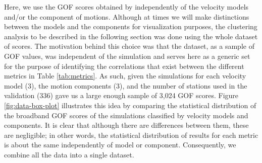Here, we use the GOF scores obtained by \citet{Taborda_2014_BSSA} independently of the velocity models and/or the component of motions. Although at times we will make distinctions between the models and the components for visualization purposes, the clustering analysis to be described in the following section was done using the whole dataset of scores. The motivation behind this choice was that the dataset, as a sample of GOF values, was independent of the simulation and serves here as a generic set for the purpose of identifying the correlations that exist between the different metrics in Table \ref{tab:metrics}. As such, given the simulations for each velocity model (3), the motion components (3), and the number of stations used in the validation (336) gave us a large enough sample of 3,024 GOF scores. Figure \ref{fig:data-box-plot} illustrates this idea by comparing the statistical distribution of the broadband GOF scores of the simulations classified by velocity models and components. It is clear that although there are differences between them, these are negligible; in other words, the statistical distribution of results for each metric is about the same independently of model or component. Consequently, we combine all the data into a single dataset.
